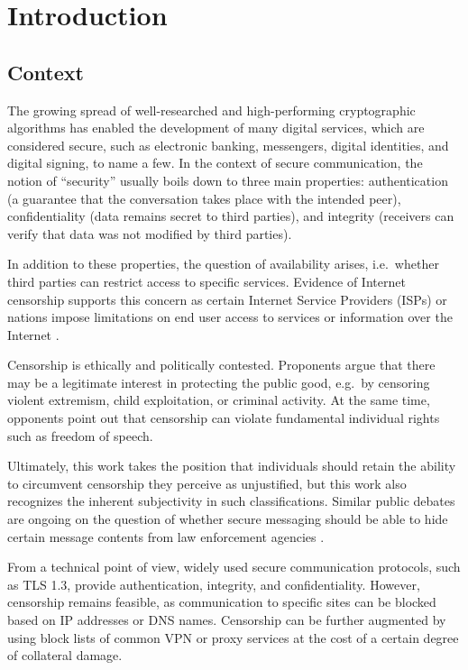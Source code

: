 \chapter{Introduction}\label{ch:introduction}

\section{Context} \label{sec:context}

The growing spread of well-researched and high-performing cryptographic algorithms has enabled the development of many digital services, which are considered secure, such as electronic banking, messengers, digital identities, and digital signing, to name a few.
In the context of secure communication, the notion of ``security'' usually boils down to three main properties: authentication (a guarantee that the conversation takes place with the intended peer), confidentiality (data remains secret to third parties), and integrity (receivers can verify that data was not modified by third parties).

In addition to these properties, the question of availability arises, i.e.~whether third parties can restrict access to specific services. Evidence of Internet censorship supports this concern as certain Internet Service Providers (ISPs) or nations impose limitations on end user access to services or information over the Internet \cite{master2023worldwide,SP:NCWHRC20,CCS:RSKE20}.

Censorship is ethically and politically contested. Proponents argue that there may be a legitimate interest in protecting the public good, e.g.~by censoring violent extremism, child exploitation, or criminal activity. At the same time, opponents point out that censorship can violate fundamental individual rights such as freedom of speech.

Ultimately, this work takes the position that individuals should retain the ability to circumvent censorship they perceive as unjustified, but this work also recognizes the inherent subjectivity in such classifications. Similar public debates are ongoing on the question of whether secure messaging should be able to hide certain message contents from law enforcement agencies \cite{menn2019facebook,townsend2025encryption}.

From a technical point of view, widely used secure communication protocols, such as TLS 1.3, provide authentication, integrity, and confidentiality. However, censorship remains feasible, as communication to specific sites can be blocked based on IP addresses or DNS names. Censorship can be further augmented by using block lists of common VPN or proxy services at the cost of a certain degree of collateral damage.

